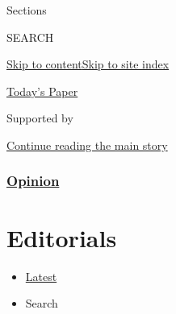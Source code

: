 Sections

SEARCH

\protect\hyperlink{site-content}{Skip to
content}\protect\hyperlink{site-index}{Skip to site index}

\href{https://myaccount.nytimes.com/auth/login?response_type=cookie\&client_id=vi}{}

\href{https://www.nytimes.com/section/todayspaper}{Today's Paper}

Supported by

\protect\hyperlink{after-sponsor}{Continue reading the main story}

\hypertarget{opinion}{%
\subsubsection{\texorpdfstring{\href{/section/opinion}{Opinion}}{Opinion}}\label{opinion}}

\hypertarget{editorials}{%
\section{Editorials}\label{editorials}}

\begin{itemize}
\tightlist
\item
  \protect\hyperlink{stream-panel}{Latest}
\item
  Search
\end{itemize}

